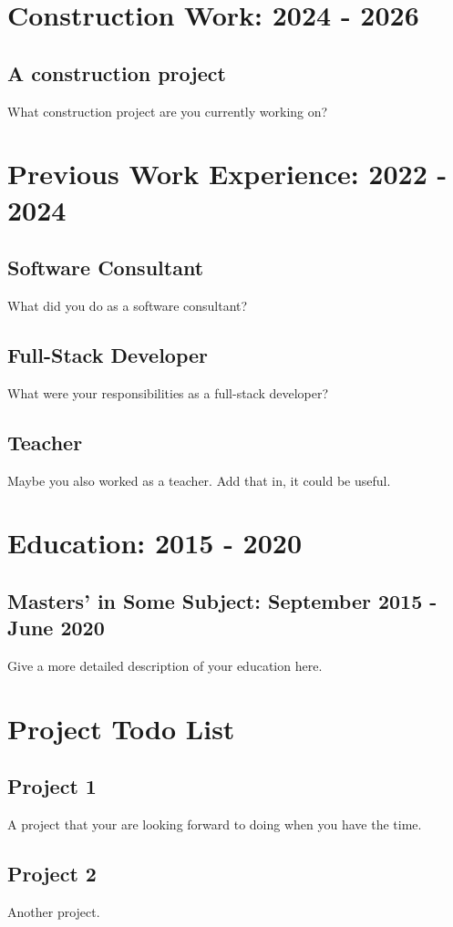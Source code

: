 \documentclass{article}
\begin{document}
\section*{Construction Work: 2024 - 2026}
\subsection*{A construction project}
What construction project are you currently working on?


\section*{Previous Work Experience: 2022 - 2024}
\subsection*{Software Consultant}
What did you do as a software consultant?

\subsection*{Full-Stack Developer}
What were your responsibilities as a full-stack developer?

\subsection*{Teacher}
Maybe you also worked as a teacher. Add that in, it could be useful.


\section*{Education: 2015 - 2020}
\subsection*{Masters’ in Some Subject: September 2015 - June 2020}
Give a more detailed description of your education here.


\section*{Project Todo List}
\subsection*{Project 1}
A project that your are looking forward to doing when you have the time.

\subsection*{Project 2}
Another project.
\end{document}
